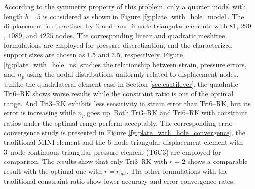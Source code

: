According to the symmetry property of this problem, only a quarter model with length $b=5$ is considered as shown in Figure \ref{fg:plate_with_hole_model}. The displacement is discretized by 3-node and 6-node triangular elements with $81$, $299$, $1089$, and $4225$ nodes. The corresponding linear and quadratic meshfree formulations are employed for pressure discretization, and the characterized support sizes are chosen as 1.5 and 2.5, respectively.
Figure \ref{fg:plate_with_hole_ns} studies the relationship between strain, pressure errors, and $n_p$ using the nodal distributions uniformly related to displacement nodes.
Unlike the quadrilateral element case in Section \ref{sec:cantilever}, the quadratic Tri6--RK shows worse results while the constraint ratio is out of the optimal range. And Tri3--RK exhibits less sensitivity in strain error than Tri6--RK, but its error is increasing while $n_p$ goes up. Both Tri3--RK and Tri6--RK with constraint ratios under the optimal range perform acceptably. 
The corresponding error convergence study is presented in Figure \ref{fg:plate_with_hole_convergence}, the traditional MINI element and the 6--node triangular displacement element with 3--node continuous triangular pressure element (T6C3) are employed for comparison. The results show that only Tri3--RK with $r=2$ shows a comparable result with the optimal one with $r=r_{opt}$. The other formulations with the traditional constraint ratio show lower accuracy and error convergence rates.

